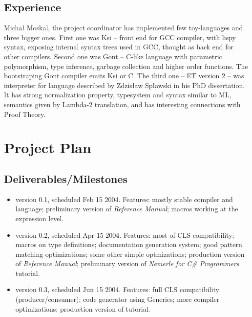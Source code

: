 \documentclass[a4paper,11pt]{article}
\begin{document}


\subsection{Experience}

Micha{\l} Moskal, the project coordinator has implemented few
toy-languages and three bigger ones. First one was Ksi -- front end for
GCC compiler, with lispy syntax, exposing internal syntax trees used in
GCC, thought as back end for other compilers.  Second one was Gont --
C-like language with parametric polymorphism, type inference, garbage
collection and higher order functions. The bootstraping Gont compiler
emits Ksi or C. The third one -- ET version 2 -- was interpreter for
language described by Zdzis{\l}aw Sp{\l}awski in his PhD dissertation.
It has strong normalization property, typesystem and syntax similar to ML,
semantics given by Lambda-2 translation, and has interesting connections
with Proof Theory.


\section{Project Plan}

\subsection{Deliverables/Milestones}
\begin{itemize}
\item version 0.1, scheduled Feb 15 2004. Features:
  mostly stable compiler and language;
  preliminary version of \textit{Reference Manual}; 
  macros working at the expression level.

\item version 0.2, scheduled Apr 15 2004. Features:
  most of CLS compatibility;
  macros on type definitions;
  documentation generation system;
  good pattern matching optimizations;
  some other simple optmizations;
  production version of \textit{Reference Manual};
  preliminary version of \textit{Nemerle for C\# Programmers} tutorial.
  
\item version 0.3, scheduled Jun 15 2004. Features:
  full CLS compatibility (producer/consumer);
  code generator using Generics;
  more compiler optimizations;
  production version of tutorial.
\end{itemize}
\end{document}
